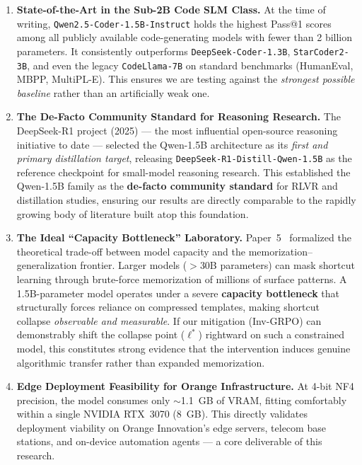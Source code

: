 \documentclass[12pt, a4paper]{article}
\begin{document}
\begin{domainbox}[title={\faFlask\ Scientific Rationale for Primary Model Selection}]
\begin{enumerate}[leftmargin=1.5em, itemsep=6pt]
  \item \textbf{State-of-the-Art in the Sub-2B Code SLM Class.}
  At the time of writing, \texttt{Qwen2.5-Coder-1.5B-Instruct} holds the highest Pass@1 scores among all publicly available code-generating models with fewer than 2 billion parameters. It consistently outperforms \texttt{DeepSeek-Coder-1.3B}, \texttt{StarCoder2-3B}, and even the legacy \texttt{CodeLlama-7B} on standard benchmarks (HumanEval, MBPP, MultiPL-E). This ensures we are testing against the \emph{strongest possible baseline} rather than an artificially weak one.

  \item \textbf{The De-Facto Community Standard for Reasoning Research.}
  The DeepSeek-R1 project (2025) --- the most influential open-source reasoning initiative to date --- selected the Qwen-1.5B architecture as its \emph{first and primary distillation target}, releasing \texttt{DeepSeek-R1-Distill-Qwen-1.5B} as the reference checkpoint for small-model reasoning research. This established the Qwen-1.5B family as the \textbf{de-facto community standard} for RLVR and distillation studies, ensuring our results are directly comparable to the rapidly growing body of literature built atop this foundation.

  \item \textbf{The Ideal ``Capacity Bottleneck'' Laboratory.}
  Paper~5~\cite{too_big_to_think} formalized the theoretical trade-off between model capacity and the memorization--generalization frontier. Larger models ($>$30B parameters) can mask shortcut learning through brute-force memorization of millions of surface patterns. A 1.5B-parameter model operates under a severe \textbf{capacity bottleneck} that structurally forces reliance on compressed templates, making shortcut collapse \emph{observable and measurable}. If our mitigation (Inv-GRPO) can demonstrably shift the collapse point ($\ell^*$) rightward on such a constrained model, this constitutes strong evidence that the intervention induces genuine algorithmic transfer rather than expanded memorization.

  \item \textbf{Edge Deployment Feasibility for Orange Infrastructure.}
  At 4-bit NF4 precision, the model consumes only $\sim$1.1~GB of VRAM, fitting comfortably within a single NVIDIA RTX~3070 (8~GB). This directly validates deployment viability on Orange Innovation's edge servers, telecom base stations, and on-device automation agents --- a core deliverable of this research.
\end{enumerate}
\end{domainbox}
\end{document}
